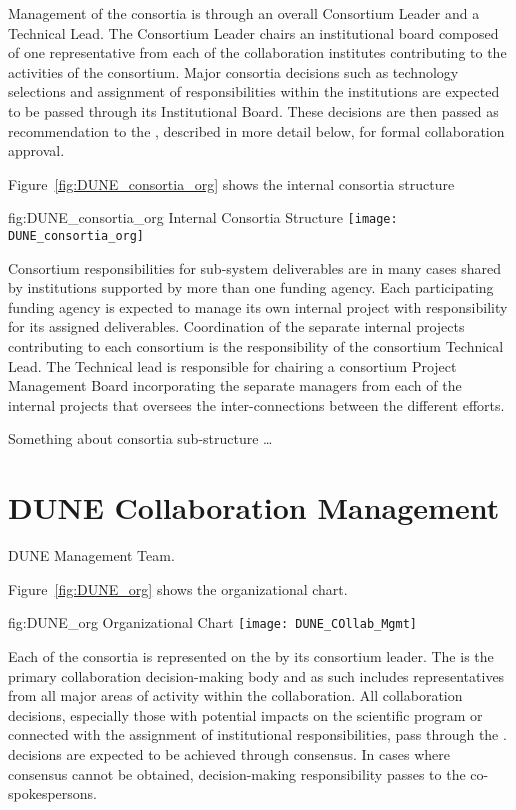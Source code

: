 Management of the consortia is through an overall Consortium Leader
and a Technical Lead.  The Consortium Leader chairs an institutional
board composed of one representative from each of the collaboration
institutes contributing to the activities of the consortium.  Major
consortia decisions such as technology selections and assignment of
responsibilities within the institutions are expected to be passed
through its Institutional Board.  These decisions are then passed as
recommendation to the  , described in more detail
below, for formal collaboration approval.

Figure~\ref{fig:DUNE_consortia_org} shows the  internal
consortia structure
\begin{dunefigure}{fig:DUNE_consortia_org}
  { Internal Consortia Structure}
  \texttt{[image: DUNE\_consortia\_org]}
\end{dunefigure}

Consortium responsibilities for sub-system deliverables are in many
cases shared by institutions supported by more than one funding
agency.  Each participating funding agency is expected to manage its
own internal project with responsibility for its assigned
deliverables.  Coordination of the separate internal projects
contributing to each consortium is the responsibility of the
consortium Technical Lead.  The Technical lead is responsible for
chairing a consortium Project Management Board incorporating the
separate managers from each of the internal projects that oversees the
inter-connections between the different efforts.

Something about consortia sub-structure …

\section{DUNE Collaboration Management}
\label{sec:dune_mgmt}

DUNE Management Team.

Figure~\ref{fig:DUNE_org} shows the  organizational chart.
\begin{dunefigure}{fig:DUNE_org}
  { Organizational Chart}
  \texttt{[image: DUNE\_COllab\_Mgmt]}
\end{dunefigure}

Each of the consortia is represented on the  
by its consortium leader.  The   is the primary
collaboration decision-making body and as such includes
representatives from all major areas of activity within the
collaboration.  All collaboration decisions, especially those with
potential impacts on the  scientific program or connected
with the assignment of institutional responsibilities, pass through
the .   decisions are expected to be achieved
through consensus.  In cases where consensus cannot be obtained,
decision-making responsibility passes to the co-spokespersons.


